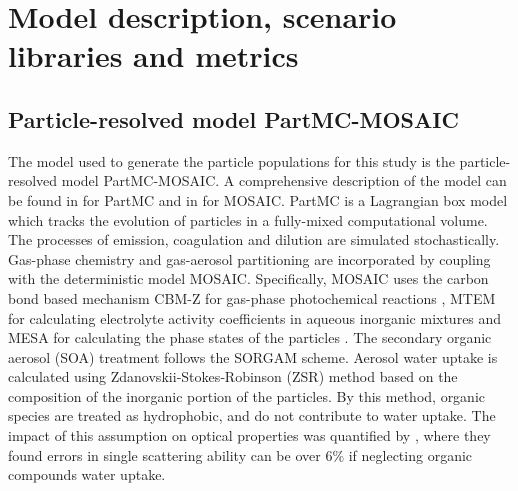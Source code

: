 \documentclass[edeposit,fullpage]{uiucthesis2009}
\begin{document}
\section{Model description, scenario libraries and metrics }
\label{sec:methods}
\subsection{Particle-resolved model PartMC-MOSAIC}
The model used to generate the particle populations for this study is
the particle-resolved model PartMC-MOSAIC. A comprehensive description
of the model can be found in \citet{Riemer2009} for PartMC and in
\citet{Zaveri2008} for MOSAIC. PartMC is a Lagrangian box model which
tracks the evolution of particles in a fully-mixed computational
volume. The processes of emission, coagulation and dilution are
simulated stochastically. Gas-phase chemistry and gas-aerosol
partitioning are incorporated by coupling with the deterministic model
MOSAIC. Specifically, MOSAIC uses the carbon bond based mechanism
CBM-Z for gas-phase photochemical reactions \citep{zaveri1999new},
MTEM for calculating electrolyte activity coefficients in aqueous
inorganic mixtures and MESA for calculating the phase states of the
particles \citep{zaveri2005computationally}. The secondary organic
aerosol (SOA) treatment follows the SORGAM scheme.  Aerosol water
uptake is calculated using Zdanovskii‐Stokes‐Robinson (ZSR) method
\citep{Zaveri2008, zdanovskii1948new,stokes1966interactions} based on
the composition of the inorganic portion of the particles.  By this
method, organic species are treated as hydrophobic, and do not
contribute to water uptake. The impact of this assumption on optical
properties was quantified by \citet{nandy2021water}, 
where they found errors in single scattering ability can be over 6\% 
if neglecting organic compounds water uptake. 
\end{document}
